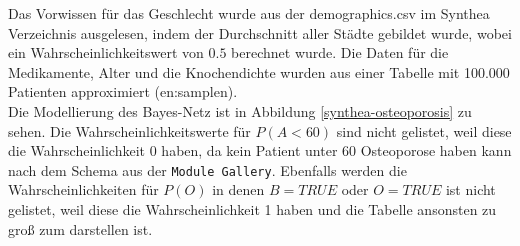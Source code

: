 \documentclass[german,version-2020-11]{uzl-thesis}
\begin{document}
Das Vorwissen für das Geschlecht wurde aus der demographics.csv im Synthea Verzeichnis ausgelesen, indem der Durchschnitt aller Städte gebildet wurde, wobei ein Wahrscheinlichkeitswert von $0.5$ berechnet wurde. Die Daten für die Medikamente, Alter und die Knochendichte wurden aus einer Tabelle mit 100.000 Patienten approximiert (en:samplen). 
\\ 
Die Modellierung des Bayes-Netz ist in Abbildung \ref{synthea-osteoporosis} zu sehen. Die Wahrscheinlichkeitswerte für $P(A < 60)$ sind nicht gelistet, weil diese die Wahrscheinlichkeit 0 haben, da kein Patient unter 60 Osteoporose haben kann nach dem Schema aus der \texttt{Module Gallery}. Ebenfalls werden die Wahrscheinlichkeiten für $P(O)$ in denen $B=TRUE$ oder $O=TRUE$ ist nicht gelistet, weil diese die Wahrscheinlichkeit 1 haben und die Tabelle ansonsten zu groß zum darstellen ist.
\end{document}
